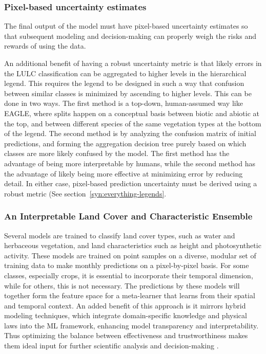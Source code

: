         \subsubsection{Pixel-based uncertainty estimates}
            The final output of the model must have pixel-based uncertainty estimates so that subsequent modeling and decision-making can properly weigh the risks and rewards of using the data.

            An additional benefit of having a robust uncertainty metric is that likely errors in the LULC classification can be aggregated to higher levels in the hierarchical legend. This requires the legend to be designed in such a way that confusion between similar classes is minimized by ascending to higher levels. This can be done in two ways. The first method is a top-down, human-assumed way like EAGLE, where splits happen on a conceptual basis between biotic and abiotic at the top, and between different species of the same vegetation types at the bottom of the legend. The second method is by analyzing the confusion matrix of initial predictions, and forming the aggregation decision tree purely based on which classes are more likely confused by the model. The first method has the advantage of being more interpretable by humans, while the second method has the advantage of likely being more effective at minimizing error by reducing detail. In either case, pixel-based prediction uncertainty must be derived using a robust metric (See section\@~\ref{syn:everything-legends}.

        \subsubsection{An Interpretable Land Cover and Characteristic Ensemble}
            Several models are trained to classify land cover types, such as water and herbaceous vegetation, and land characteristics such as height and photosynthetic activity. These models are trained on point samples on a diverse, modular set of training data to make monthly predictions on a pixel-by-pixel basis. For some classes, especially crops, it is essential to incorporate their temporal dimension, while for others, this is not necessary. The predictions by these models will together form the feature space for a meta-learner that learns from their spatial and temporal context. 
            An added benefit of this approach is it mirrors hybrid modeling techniques, which integrate domain-specific knowledge and physical laws into the ML framework, enhancing model transparency and interpretability. Thus optimizing the balance between effectiveness and trustworthiness makes them ideal input for further scientific analysis and decision-making \citep{ferchichi2022forecasting}.

